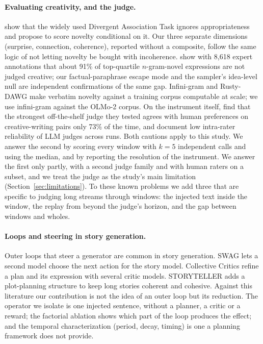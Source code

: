 \paragraph{Evaluating creativity, and the judge.} \citet{nakajima-etal-2026-beyond}
show that the widely used Divergent Association Task ignores appropriateness
and propose to score novelty conditional on it. Our three separate
dimensions (surprise, connection, coherence), reported without a composite,
follow the same logic of not letting novelty be bought with incoherence.
\citet{saakyan2026death} show with 8,618 expert annotations that about 91\%
of top-quartile $n$-gram-novel expressions are not judged creative; our
factual-paraphrase escape mode and the sampler's idea-level null are
independent confirmations of the same gap. Infini-gram
\citep{liu2024infinigram} and Rusty-DAWG \citep{merrill2024rustydawg} make
verbatim novelty against a training corpus computable at scale; we use
infini-gram against the OLMo-2 corpus. On the instrument itself,
\citet{fein-etal-2026-litbench} find that the strongest off-the-shelf judge
they tested agrees with human preferences on creative-writing pairs only
73\% of the time, and \citet{haldar-hockenmaier-2025-rating} document low
intra-rater reliability of LLM judges across runs. Both cautions apply to
this study. We answer the second by scoring every window with $k=5$
independent calls and using the median, and by reporting the resolution of
the instrument. We answer the first only partly, with a second judge family
and with human raters on a subset, and we treat the judge as the study's
main limitation (Section~\ref{sec:limitations}). To these known problems
we add three that are specific to judging long streams through windows:
the injected text inside the window, the replay from beyond the judge's
horizon, and the gap between windows and wholes.

\paragraph{Loops and steering in story generation.} Outer loops that steer
a generator are common in story generation. SWAG \citep{pei-etal-2024-swag}
lets a second model choose the next action for the story model. Collective
Critics \citep{bae-kim-2024-collective} refine a plan and its expression with
several critic models. STORYTELLER \citep{li-etal-2025-storyteller} adds a
plot-planning structure to keep long stories coherent and cohesive. Against
this literature our contribution is not the idea of an outer loop but its
reduction. The operator we isolate is one injected sentence, without a
planner, a critic or a reward; the factorial ablation shows which part of
the loop produces the effect; and the temporal characterization (period,
decay, timing) is one a planning framework does not provide.

